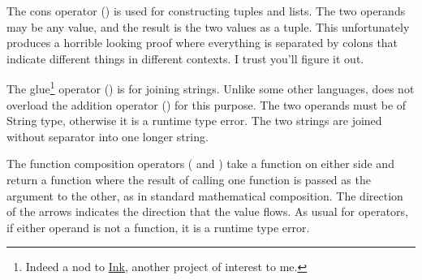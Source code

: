 \begin{prooftree}
\end{prooftree}

The cons operator (\op{:}) is used for constructing tuples and lists. The
two operands may be any value, and the result is the two values as a tuple.
This unfortunately produces a horrible looking proof where everything is
separated by colons that indicate different things in different contexts.
I trust you'll figure it out.

\begin{prooftree}
\end{prooftree}

The glue\footnote{Indeed a nod to \href{https://www.inklestudios.com/ink/}{Ink}, another
project of interest to me.} operator (\op{<>}) is for joining strings. Unlike some
other languages, \Trilogy{} does not overload the addition operator (\op{+}) for
this purpose. The two operands must be of String type, otherwise it is a runtime
type error. The two strings are joined without separator into one longer string.

\begin{prooftree}
\end{prooftree}

The function composition operators (\op{<<} and \op{>>}) take a function on either
side and return a function where the result of calling one function is passed as the
argument to the other, as in standard mathematical composition. The direction of
the arrows indicates the direction that the value flows. As usual for operators,
if either operand is not a function, it is a runtime type error.

\begin{prooftree}
\end{prooftree}

\begin{prooftree}
\end{prooftree}

